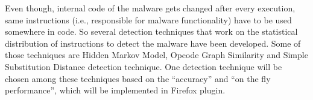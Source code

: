 Even though, internal code of the malware gets changed after every execution, same instructions (i.e., responsible for malware functionality) have to be used somewhere in code. So several detection techniques that work on the statistical distribution of instructions to detect the malware have been developed. Some of those techniques are Hidden Markov Model, Opcode Graph Similarity and Simple Substitution Distance detection technique. One detection technique will be chosen among these techniques based on the “accuracy” and “on the fly performance”, which will be implemented in Firefox plugin.